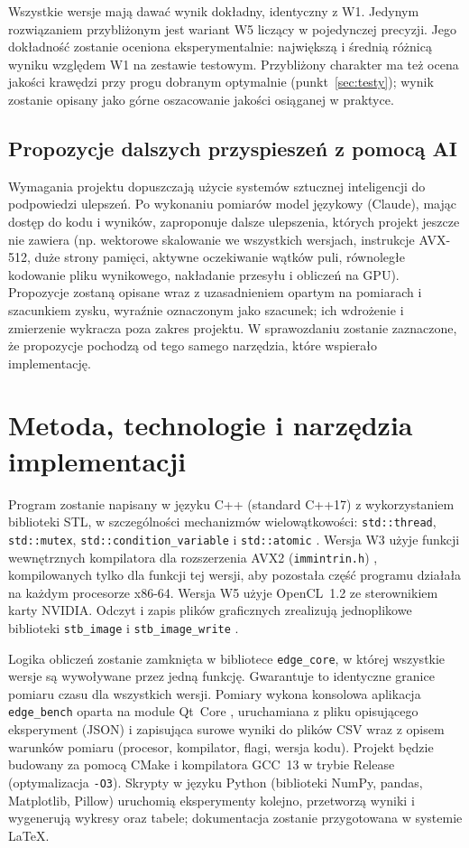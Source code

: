 \documentclass[12pt,a4paper]{article}
\newcommand{\kod}[1]{\texttt{#1}}
\begin{document}
Wszystkie wersje mają dawać wynik dokładny, identyczny z W1. Jedynym rozwiązaniem przybliżonym jest wariant W5 liczący w pojedynczej precyzji. Jego dokładność zostanie oceniona eksperymentalnie: największą i średnią różnicą wyniku względem W1 na zestawie testowym. Przybliżony charakter ma też ocena jakości krawędzi przy progu dobranym optymalnie (punkt~\ref{sec:testy}); wynik zostanie opisany jako górne oszacowanie jakości osiąganej w praktyce.

\subsection{Propozycje dalszych przyspieszeń z pomocą AI}

Wymagania projektu dopuszczają użycie systemów sztucznej inteligencji do podpowiedzi ulepszeń. Po wykonaniu pomiarów model językowy (Claude), mając dostęp do kodu i wyników, zaproponuje dalsze ulepszenia, których projekt jeszcze nie zawiera (np. wektorowe skalowanie we wszystkich wersjach, instrukcje AVX-512, duże strony pamięci, aktywne oczekiwanie wątków puli, równoległe kodowanie pliku wynikowego, nakładanie przesyłu i obliczeń na GPU). Propozycje zostaną opisane wraz z uzasadnieniem opartym na pomiarach i szacunkiem zysku, wyraźnie oznaczonym jako szacunek; ich wdrożenie i zmierzenie wykracza poza zakres projektu. W sprawozdaniu zostanie zaznaczone, że propozycje pochodzą od tego samego narzędzia, które wspierało implementację.

\section{Metoda, technologie i narzędzia implementacji}

Program zostanie napisany w języku C++ (standard C++17) z wykorzystaniem biblioteki STL, w szczególności mechanizmów wielowątkowości: \kod{std::thread}, \kod{std::mutex}, \kod{std::condition\_variable} i \kod{std::atomic} \cite{williams,cppreference}. Wersja W3 użyje funkcji wewnętrznych kompilatora dla rozszerzenia AVX2 (\kod{immintrin.h}) \cite{intel}, kompilowanych tylko dla funkcji tej wersji, aby pozostała część programu działała na każdym procesorze x86-64. Wersja W5 użyje OpenCL~1.2 ze sterownikiem karty NVIDIA. Odczyt i zapis plików graficznych zrealizują jednoplikowe biblioteki \kod{stb\_image} i \kod{stb\_image\_write} \cite{stb}.

Logika obliczeń zostanie zamknięta w bibliotece \kod{edge\_core}, w której wszystkie wersje są wywoływane przez jedną funkcję. Gwarantuje to identyczne granice pomiaru czasu dla wszystkich wersji. Pomiary wykona konsolowa aplikacja \kod{edge\_bench} oparta na module Qt~Core \cite{qt}, uruchamiana z pliku opisującego eksperyment (JSON) i zapisująca surowe wyniki do plików CSV wraz z opisem warunków pomiaru (procesor, kompilator, flagi, wersja kodu). Projekt będzie budowany za pomocą CMake i kompilatora GCC~13 w trybie Release (optymalizacja \kod{-O3}). Skrypty w języku Python (biblioteki NumPy, pandas, Matplotlib, Pillow) uruchomią eksperymenty kolejno, przetworzą wyniki i wygenerują wykresy oraz tabele; dokumentacja zostanie przygotowana w systemie \LaTeX.
\end{document}
